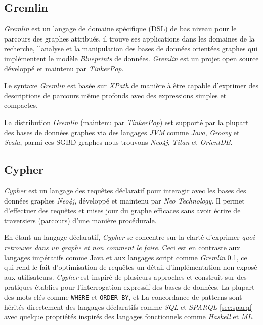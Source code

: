   \subsection{Gremlin}
  \label{sec:gremlin}
  \emph{Gremlin} \cite{gremlin-wiki} est un langage de domaine
  spécifique (\acrshort{DSL}) de bas niveau pour le parcours des
  graphes attribués, il trouve ses applications dans les domaines de
  la recherche, l'analyse et la manipulation des bases de données
  orientées graphes qui implémentent le modèle \emph{Blueprints}
  \cite{blueprints} de données. \emph{Gremlin} \cite{gremlin-wiki} est
  un projet open source développé et maintenu par \emph{TinkerPop}.

  Le syntaxe \emph{Gremlin} est basée sur \emph{XPath} de manière à
  être capable d'exprimer des descriptions de parcours même profonds
  avec des expressions simples et compactes.

  La distribution \emph{Gremlin} (maintenu par \emph{TinkerPop}) est
  supporté par la plupart des bases de données graphes via des
  langages \emph{JVM} comme \emph{Java}, \emph{Groovy} et
  \emph{Scala}, parmi ces \acrshort{SGBD} graphes nous trouvons
  \emph{Neo4j}, \emph{Titan} et \emph{OrientDB}.

  \subsection{Cypher}
  \label{sec:cypher}
  \emph{Cypher} \cite{cypher-docs} est un langage des requêtes
  déclaratif pour interagir avec les bases des données graphes
  \emph{Neo4j}, développé et maintenu par \emph{Neo Technology}. Il
  permet d'effectuer des requêtes et mises jour du graphe efficaces
  sans avoir écrire de traversiers (parcours) d'une manière
  procédurale.

  En étant un langage déclaratif, \emph{Cypher} se concentre sur la
  clarté d'exprimer \textit{quoi retrouver dans un graphe et non
    comment le faire}. Ceci est en contraste aux langages impératifs
  comme Java et aux langages script comme \emph{Gremlin}
  \ref{sec:gremlin}, ce qui rend le fait d'optimisation de requêtes un
  détail d'implémentation non exposé aux utilisateurs. \emph{Cypher}
  est inspiré de plusieurs approches et construit sur des pratiques
  établies pour l'interrogation expressif des bases de données. La
  plupart des mots clés comme \verb|WHERE| et \verb|ORDER BY|, et La
  concordance de patterns sont hérités directement des langages
  déclaratifs comme \emph{SQL} et \emph{SPARQL} \ref{sec:sparql} avec
  quelque propriétés inspirés des langages fonctionnels comme
  \emph{Haskell} et \emph{ML}.

